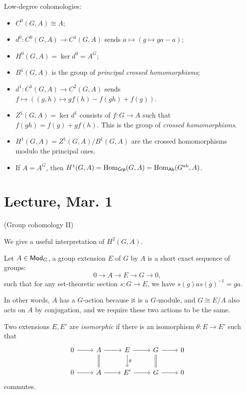 \documentclass[11pt]{amsart}
\begin{document}
\begin{exm}
    Low-degree cohomologies:
    \begin{itemize}
        \item $C^0(G,A)\cong A$;
        \item $d^0: C^0(G,A)\to C^1(G,A)$ sends $a\mapsto (g\mapsto ga-a)$;
        \item $H^0(G,A) = \ker d^0 = A^G$;
        \item $B^1(G,A)$ is the group of \emph{principal crossed homomorphisms};
        \item $d^1: C^1(G,A)\to C^2(G,A)$ sends $f \mapsto ((g,h) \mapsto gf(h) - f(gh) + f(g))$.
        \item $Z^1(G,A) = \ker d^1$ consists of $f:G\to A$ such that $f(gh) = f(g) + gf(h)$. This is the group of \emph{crossed homomorphisms}.
        \item $H^1(G,A) = Z^1(G,A)/B^1(G,A)$ are the crossed homomorphisms modulo the principal ones.
        \item If $A = A^G$, then $H^1(G,A) = \operatorname{Hom}_{\mathsf{Grp}}(G,A) = \operatorname{Hom}_{\mathsf{Ab}}(G^{\text{ab}}, A)$.
    \end{itemize}
\end{exm}


\section{Lecture, Mar. 1}

(Group cohomology II)


We give a useful interpretation of $H^2(G,A)$.

\begin{defn}
    Let $A\in \mathsf{Mod}_G$, a group extension $E$ of $G$ by $A$ is a short exact sequence of groups:
    \[0\to A\to E\to G \to 0,\]
    such that for any set-theoretic section $s: G\to E$, we have $s(g)as(g)^{-1} = ga$.
\end{defn}

In other words, $A$ has a $G$-action because it is a $G$-module, and $G\cong E/A$ also acts on $A$ by conjugation, and we require these two actions to be the same.

Two extensions $E,E'$ are \emph{isomorphic} if there is an isomorphism $\theta: E\to E'$ such that
\[
\begin{tikzcd}
    0 \arrow[r] & A \arrow[r] \arrow[d, equal] & E\arrow[r] \arrow[d, "\theta"] & G\arrow[r]\arrow[d, equal] & 0 \\
    0\arrow[r] & A\arrow[r] & E'\arrow[r] & G\arrow[r] & 0
\end{tikzcd}
\]
commutes.
\end{document}
